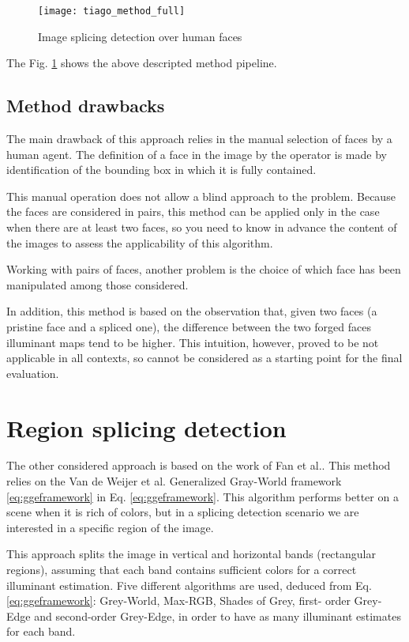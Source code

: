 \begin{figure}[h!]
  \centering
    \texttt{[image: tiago\_method\_full]}
    \caption{Image splicing detection over human faces}
    \label{fig:tiago_method_full}
\end{figure}

The Fig. \ref{fig:tiago_method_full} shows the above descripted method pipeline.

\subsection{Method drawbacks}

The main drawback of this approach relies in the manual selection of faces by a human agent. The definition of a face in the image by the operator is made by identification of the bounding box in which it is fully contained.

This manual operation does not allow a blind approach to the problem. Because the faces are considered in pairs, this method can be applied only in the case when there are at least two faces, so you need to know in advance the content of the images to assess the applicability of this algorithm.

Working with pairs of faces, another problem is the choice of which face has been manipulated among those considered. 

In addition, this method is based on the observation that, given two faces (a pristine face and a spliced one), the difference between the two forged faces illuminant maps tend to be higher. This intuition, however, proved to be not applicable in all contexts, so cannot be considered as a starting point for the final evaluation.

\section{Region splicing detection}

The other considered approach is based on the work of Fan et al.\cite{fan2015image}. This method relies on the Van de Weijer et al.\cite{van2007edge} Generalized Gray-World framework \ref{eq:ggeframework} in Eq. \ref{eq:ggeframework}. This algorithm performs better on a scene when it is rich of colors, but in a splicing detection scenario we are interested in a specific region of the image.

This approach splits the image in vertical and horizontal bands (rectangular regions), assuming that each band contains sufficient colors for a correct illuminant estimation. Five different algorithms are used, deduced from Eq. \ref{eq:ggeframework}: Grey-World, Max-RGB, Shades of Grey, first- order Grey-Edge and second-order Grey-Edge, in order to have as many illuminant estimates for each band.

